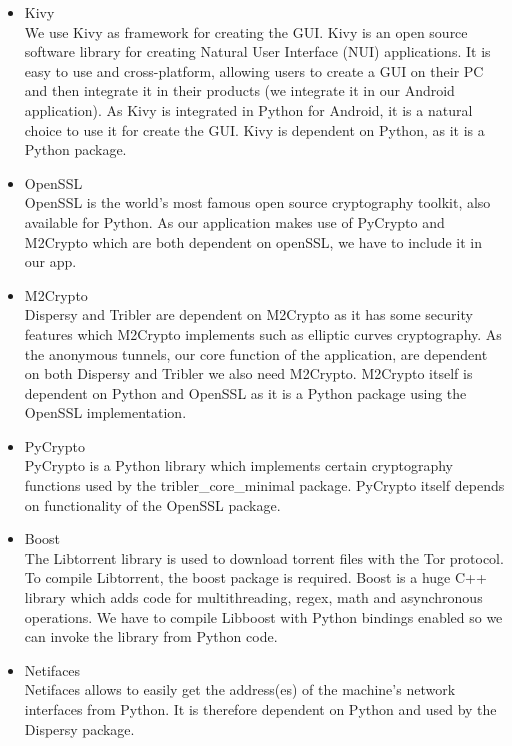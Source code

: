 		\begin{itemize}
		
			\item Kivy\\
			We use Kivy as framework for creating the GUI. Kivy is an open source software library for creating Natural User Interface (NUI) applications. It is easy to use and cross-platform, allowing users to create a GUI on their PC and then integrate it in their products (we integrate it in our Android application). As Kivy is integrated in Python for Android, it is a natural choice to use it for create the GUI. Kivy is dependent on Python, as it is a Python package. 
		
			\item OpenSSL\\
			OpenSSL is the world's most famous open source cryptography toolkit, also available for Python. As our application makes use of PyCrypto and M2Crypto which are both dependent on openSSL, we have to include it in our app.
		
			\item M2Crypto\\
			Dispersy and Tribler are dependent on M2Crypto as it has some security features which M2Crypto implements such as elliptic curves cryptography. As the anonymous tunnels, our core function of the application, are dependent on both Dispersy and Tribler we also need M2Crypto. M2Crypto itself is dependent on Python and OpenSSL as it is a Python package using the OpenSSL implementation.
		
			\item PyCrypto\\
			PyCrypto is a Python library which implements certain cryptography functions used by the tribler\_core\_minimal package. PyCrypto itself depends on functionality of the OpenSSL package.
		
			\item Boost\\
			The Libtorrent library is used to download torrent files with the Tor protocol. To compile Libtorrent, the boost package is required. Boost is a huge C++ library which adds code for multithreading, regex, math and asynchronous operations. We have to compile Libboost with Python bindings enabled so we can invoke the library from Python code.
		
			\item Netifaces\\
			Netifaces allows to easily get the address(es) of the machine's network interfaces from Python. It is therefore dependent on Python and used by the Dispersy package.
		

\end{itemize}
